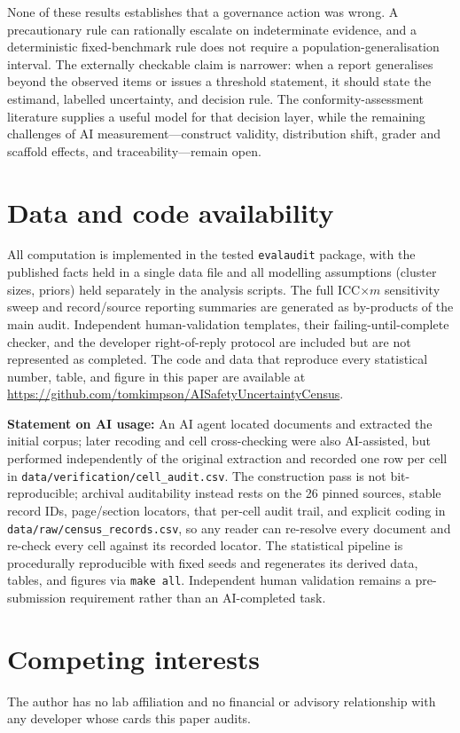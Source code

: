 \documentclass{article}
\begin{document}
None of these results establishes that a governance action was wrong. A precautionary rule
can rationally escalate on indeterminate evidence, and a deterministic fixed-benchmark rule
does not require a population-generalisation interval. The externally checkable claim is
narrower: when a report generalises beyond the observed items or issues a threshold
statement, it should state the estimand, labelled uncertainty, and decision rule. The
conformity-assessment literature supplies a useful model for that decision layer, while the
remaining challenges of AI measurement—construct validity, distribution shift, grader and
scaffold effects, and traceability—remain open.

\section*{Data and code availability}
All computation is implemented in the tested \texttt{evalaudit} package,
with the published facts held in a single data file and all modelling assumptions
(cluster sizes, priors) held separately in the analysis scripts. The full ICC$\times m$
sensitivity sweep and record/source reporting summaries are generated as by-products of the
main audit. Independent human-validation templates, their failing-until-complete checker,
and the developer right-of-reply protocol are included but are not represented as completed.
The code and data that reproduce every statistical number, table, and figure in this paper
are available at
\url{https://github.com/tomkimpson/AISafetyUncertaintyCensus}.

\textbf{Statement on AI usage:} An AI agent located documents and extracted the initial
corpus; later recoding and cell cross-checking were also AI-assisted, but performed
independently of the original extraction and recorded one row per cell in
\texttt{data/verification/cell\_audit.csv}. The construction pass is not bit-reproducible;
archival auditability instead rests on the 26 pinned sources, stable record IDs,
page/section locators, that per-cell audit trail, and explicit coding in
\texttt{data/raw/census\_records.csv}, so any reader can re-resolve every document and
re-check every cell against its recorded locator. The statistical pipeline is procedurally
reproducible with fixed seeds and regenerates its derived data, tables, and figures via
\texttt{make all}. Independent human validation remains a pre-submission requirement rather
than an AI-completed task.

\section*{Competing interests}
The author has no lab affiliation and no financial or advisory relationship with any
developer whose cards this paper audits.
\end{document}
